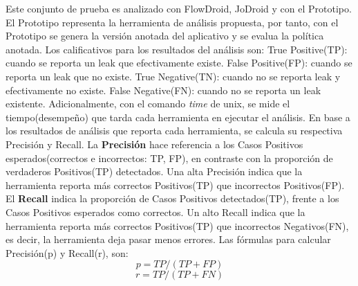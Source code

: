 Este conjunto de prueba es analizado con FlowDroid, JoDroid y con el Prototipo. 
El Prototipo representa la herramienta de análisis propuesta, por tanto, con el
Prototipo se genera la versión anotada del aplicativo y se evalua la política
anotada.\newline
Los calificativos para los resultados del análisis son:  
True Positive(TP): cuando se reporta un leak que efectivamente existe. 
False Positive(FP): cuando se reporta un leak que no existe.  
True Negative(TN): cuando no se reporta leak y efectivamente no existe. 
False Negative(FN): cuando no se reporta un leak existente.\newline
Adicionalmente, con el comando \textit{time}\cite{time-man} de unix, se mide el
tiempo(desempeño) que tarda cada herramienta en ejecutar el análisis.\newline
En base a los resultados de análisis que reporta cada herramienta, se
calcula su respectiva Precisión y Recall.\newline
La \textbf{Precisión} hace referencia a los Casos Positivos esperados(correctos
e incorrectos: TP, FP), en contraste con la proporción de verdaderos Positivos(TP)
detectados\cite{Precision-Recall}. Una alta Precisión indica que la herramienta
reporta más correctos Positivos(TP) que incorrectos Positivos(FP).\newline 
El \textbf{Recall} indica la proporción de Casos Positivos detectados(TP),
frente a los Casos Positivos esperados como correctos\cite{Precision-Recall}. Un
alto Recall indica que la herramienta reporta más correctos Positivos(TP) que incorrectos
Negativos(FN), es decir, la herramienta deja pasar menos errores.\newline
Las fórmulas para calcular Precisión(p) y Recall(r), son:
\begin{equation}
\label{pre}
	p = TP/(TP +FP) 
\end{equation}
\begin{equation}
\label{rec}
	r = TP/(TP+FN)
\end{equation}
